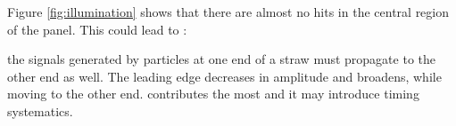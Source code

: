 Figure \ref{fig:illumination} 
shows that there are almost no hits in the central region of the panel. 
This could lead to :

the signals generated by 
particles at one end of a straw must propagate to the other end as well. 
The leading edge decreases in amplitude and broadens, while moving to 
the other end. 
contributes the most 
and it may introduce timing systematics.




